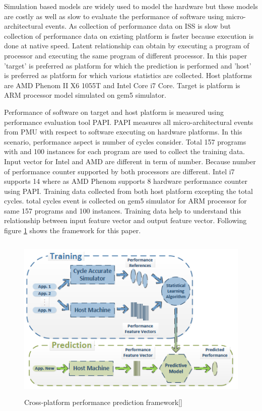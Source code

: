 \par Simulation based models are widely used to model the hardware but these models are costly as well as slow to evaluate the performance of software using micro-architectural events. As collection of performance data on ISS is slow but collection of performance data on existing platform is faster because execution is done at native speed. Latent relationship can obtain by executing a program of processor and executing the same program of different processor. In this paper 'target' is preferred as platform for which the prediction is performed and 'host' is preferred as platform for which various statistics are collected. Host platforms are AMD Phenom II X6 1055T and Intel Core i7 Core. Target is platform is ARM processor model simulated on gem5 simulator.  

\par Performance of software on target and host platform is measured using performance evaluation tool PAPI. PAPI measures all micro-architectural events from PMU with respect to software executing on hardware platforms. In this scenario, performance aspect is number of cycles consider. Total 157 programs with and 100 instances for each program are used to collect the training data. Input vector for Intel and AMD are different in term of number. Because number of performance counter supported by both processors are different. Intel i7 supports 14 where as AMD Phenom supports 8 hardware performance counter using PAPI. Training data collected from both host platform excepting the total cycles. total cycles event is collected on gem5 simulator for ARM processor for same 157 programs and 100 instances. Training data help to understand this relationship between input feature vector and output feature vector. Following figure \ref{fig:paper1} shows the framework for this paper. 

\begin{figure}[h!]
\includegraphics[width=12cm, height=8cm]{./images/ieee1}
\centering
\caption{Cross-platform performance prediction framework[]}
\label{fig:paper1}
\end{figure} 

